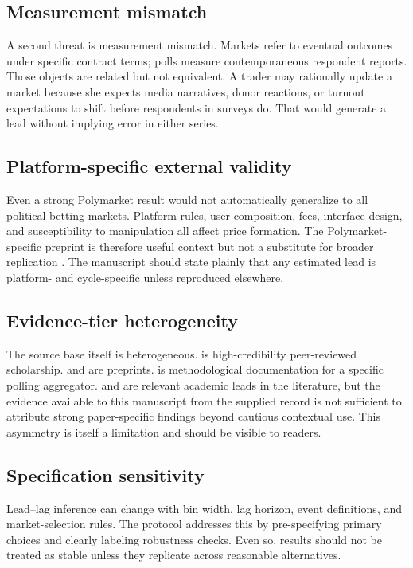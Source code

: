 \documentclass[11pt]{article}
\begin{document}
\subsection{Measurement mismatch}
A second threat is measurement mismatch. Markets refer to eventual outcomes under specific contract terms; polls measure contemporaneous respondent reports. Those objects are related but not equivalent. A trader may rationally update a market because she expects media narratives, donor reactions, or turnout expectations to shift before respondents in surveys do. That would generate a lead without implying error in either series.

\subsection{Platform-specific external validity}
Even a strong Polymarket result would not automatically generalize to all political betting markets. Platform rules, user composition, fees, interface design, and susceptibility to manipulation all affect price formation. The Polymarket-specific preprint is therefore useful context but not a substitute for broader replication \citep{arebettingmarketsb2025arxiv}. The manuscript should state plainly that any estimated lead is platform- and cycle-specific unless reproduced elsewhere.

\subsection{Evidence-tier heterogeneity}
The source base itself is heterogeneous. \citet{predictionmarkets2004aeaweb} is high-credibility peer-reviewed scholarship. \citet{modelsmarketsandth2021arxiv} and \citet{arebettingmarketsb2025arxiv} are preprints. \citet{howourpollingavera2023fivethir} is methodological documentation for a specific polling aggregator. \citet{informationflowbet2018ideas} and \citet{marketsvspollsasel2000scienced} are relevant academic leads in the literature, but the evidence available to this manuscript from the supplied record is not sufficient to attribute strong paper-specific findings beyond cautious contextual use. This asymmetry is itself a limitation and should be visible to readers.

\subsection{Specification sensitivity}
Lead--lag inference can change with bin width, lag horizon, event definitions, and market-selection rules. The protocol addresses this by pre-specifying primary choices and clearly labeling robustness checks. Even so, results should not be treated as stable unless they replicate across reasonable alternatives.
\end{document}
